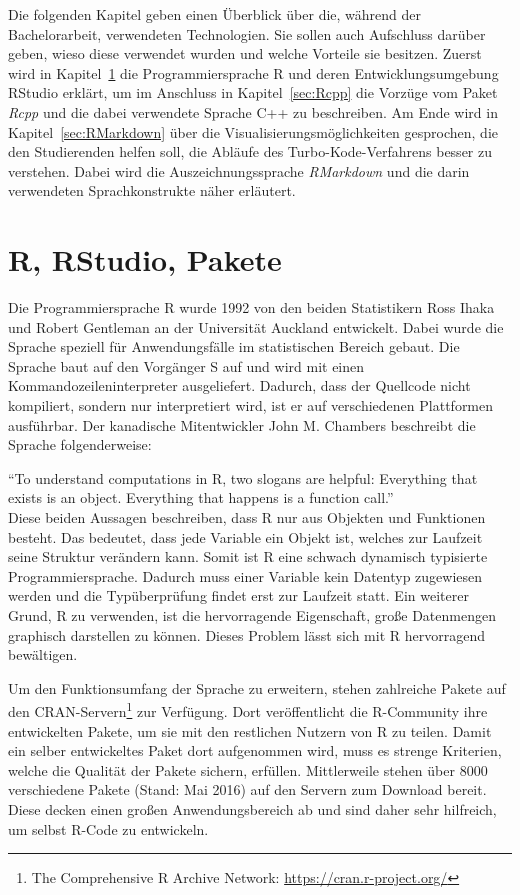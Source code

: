 Die folgenden Kapitel geben einen Überblick über die, während der Bachelorarbeit, verwendeten Technologien. Sie sollen auch Aufschluss darüber geben, wieso diese verwendet wurden und welche Vorteile sie besitzen. Zuerst wird in Kapitel~\ref{sec:R} die Programmiersprache R und deren Entwicklungsumgebung RStudio erklärt, um im Anschluss in Kapitel~\ref{sec:Rcpp} die Vorzüge vom Paket \emph{Rcpp} und die dabei verwendete Sprache C++ zu beschreiben. Am Ende wird in Kapitel~\ref{sec:RMarkdown} über die Visualisierungsmöglichkeiten gesprochen, die den Studierenden helfen soll, die Abläufe des Turbo-Kode-Verfahrens besser zu verstehen. Dabei wird die Auszeichnungssprache \emph{RMarkdown} und die darin verwendeten Sprachkonstrukte näher erläutert.

\section{R, RStudio, Pakete}
\label{sec:R}
Die Programmiersprache R wurde 1992 von den beiden Statistikern  Ross Ihaka und Robert Gentleman an der Universität Auckland entwickelt. Dabei wurde die Sprache speziell für Anwendungsfälle im statistischen Bereich gebaut. Die Sprache baut auf den Vorgänger S auf und wird mit einen Kommandozeileninterpreter ausgeliefert. Dadurch, dass der Quellcode nicht kompiliert, sondern nur interpretiert wird, ist er auf verschiedenen Plattformen ausführbar. Der kanadische Mitentwickler John M. Chambers beschreibt die Sprache folgenderweise:

\enquote{To understand computations in R, two slogans are helpful: Everything that exists is an object. Everything that happens is a function call.}~\cite{chambers2014object}\\

Diese beiden Aussagen beschreiben, dass R nur aus Objekten und Funktionen besteht. Das bedeutet, dass jede Variable ein Objekt ist, welches zur Laufzeit seine Struktur verändern kann. Somit ist R eine schwach dynamisch typisierte Programmiersprache. Dadurch muss einer Variable kein Datentyp zugewiesen werden und die Typüberprüfung findet erst zur Laufzeit statt. Ein weiterer Grund, R zu verwenden, ist die hervorragende Eigenschaft, große Datenmengen graphisch darstellen zu können. Dieses Problem lässt sich mit R hervorragend bewältigen.

Um den Funktionsumfang der Sprache zu erweitern, stehen zahlreiche Pakete auf den CRAN-Servern\footnote{The Comprehensive R Archive Network: \url{https://cran.r-project.org/}} zur Verfügung. Dort veröffentlicht die R-Community ihre entwickelten Pakete, um sie mit den restlichen Nutzern von R zu teilen. Damit ein selber entwickeltes Paket dort aufgenommen wird, muss es strenge Kriterien, welche die Qualität der Pakete sichern, erfüllen. Mittlerweile stehen über 8000 verschiedene Pakete (Stand: Mai 2016) auf den Servern zum Download bereit. Diese decken einen großen Anwendungsbereich ab und sind daher sehr hilfreich, um selbst R-Code zu entwickeln.~\cite{rmanual}

